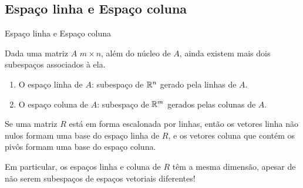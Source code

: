 \subsection*{Espaço linha e Espaço coluna}
\begin{frame}[label=lild]{Espaço linha e Espaço coluna}

Dada uma matriz $A$  $m\times n$, além do núcleo de $A$, ainda existem mais dois subespaços associados à ela.
\begin{enumerate}
\item {\color{blue}O espaço linha de $A$}: subespaço de $\mathbb{R}^n$ gerado pela linhas de $A$.
\item {\color{blue}O espaço coluna de $A$}: subespaço de $\mathbb{R}^m$ gerados pelas colunas de $A$.
\end{enumerate}

\begin{teo}
Se uma matriz {\color{red}$R$ está em forma escalonada por linhas}, então os vetores linha não nulos formam uma base do espaço linha de $R$, e os vetores coluna que contém os pivôs formam uma base do espaço coluna. 
\end{teo}

\begin{exampleblock}{}
Em particular, os espaços linha e coluna de $R$ têm a mesma dimensão, apesar de não serem  subespaços de espaços vetoriais diferentes!
\end{exampleblock}

\end{frame}


